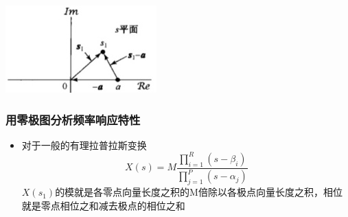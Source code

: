 \documentclass[CJKutf8,dvipsnames,table]{beamer}
\begin{document}
\begin{CJK*}{UTF8}{song}
\begin{frame}
\begin{itemize}
    \end{itemize}
    \begin{center}
      \includegraphics[scale=.5]{ss-c-f9-15}
    \end{center}
  \end{frame}
  
  \begin{frame}
    \frametitle{用零极图分析频率响应特性}
    \begin{itemize}
    \item 对于一般的有理拉普拉斯变换
	\[
		X(s) = M\frac{\prod_{i=1}^{R}(s-\beta_i)}{\prod_{j=1}^{P}(s-\alpha_j)}
	\]
	$X(s_1)$的模就是各零点向量长度之积的M倍除以各极点向量长度之积，相位就是零点相位之和减去极点的相位之和
    \end{itemize}
  \end{frame}    
  

\end{CJK*}
\end{document}
